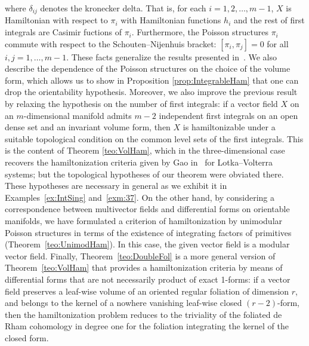 \documentclass[10pt,a4paper]{amsart}
\numberwithin{equation}{section}
\begin{document}
where $\delta_{ij}$ denotes the kronecker delta. That is, for each $i=1,2,\dots, m-1$, $X$ is Hamiltonian with respect to $\pi_i$ with Hamiltonian functions $h_i$ and the rest of first integrals are Casimir fuctions of $\pi_i$. Furthermore, the Poisson structures $\pi_{i}$ commute with respect to the Schouten--Nijenhuis bracket: $[\pi_i,\pi_j]=0$ for all $i,j=1,\dots,m-1$. These facts generalize the results presented in~\cite{Gumral-Nut}. We also describe the dependence of the Poisson structures on the choice of the volume form, which allows us to show in Proposition \ref{prop:IntegrableHam} that one can drop the orientability hypothesis. Moreover, we also improve the previous result by relaxing the hypothesis on the number of first integrals: if a vector field $X$ on an $m$-dimensional manifold admits $m-2$ independent first integrals on an open dense set and an invariant volume form, then $X$ is hamiltonizable under a suitable topological condition on the common level sets of the first integrals. This is the content of Theorem \ref{teo:VolHam}, which in the three-dimensional case recovers the hamiltonization criteria given by Gao in~\cite{Gao-2000} for Lotka--Volterra systems; but the topological hypotheses of our theorem were obviated there. These hypotheses are necessary in general as we exhibit it in Examples~\ref{ex:IntSing} and~\ref{exm:37}. On the other hand, by considering a correspondence between multivector fields and differential forms on orientable manifolds, we have formulated a criterion of hamiltonization by unimodular Poisson structures in terms of the existence of integrating factors of primitives (Theorem~\ref{teo:UnimodHam}). In this case, the given vector field is a modular vector field. Finally, Theorem~\ref{teo:DoubleFol} is a more general version of Theorem~\ref{teo:VolHam} that provides a hamiltonization criteria by means of differential forms that are not necessarily product of exact 1-forms: if a vector field preserves a leaf-wise volume of an oriented regular foliation of dimension $r$, and belongs to the kernel of a nowhere vanishing leaf-wise closed $(r-2)$-form, then the hamiltonization problem reduces to the triviality of the foliated de Rham cohomology in degree one for the foliation integrating the kernel of the closed form.
\end{document}
